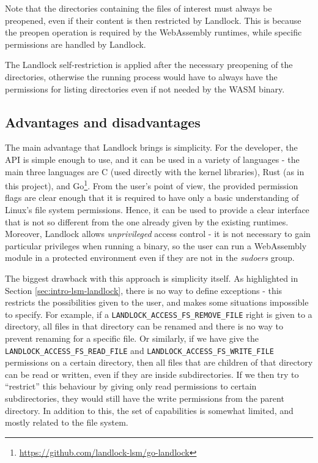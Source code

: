 Note that the directories containing the files of interest must always be preopened,
even if their content is then restricted by Landlock. This is because the preopen operation
is required by the WebAssembly runtimes, while specific permissions are handled by Landlock.

The Landlock self-restriction is applied after the necessary preopening of the directories,
otherwise the running process would have to always have the permissions for listing directories even if
not needed by the WASM binary.

\subsection{Advantages and disadvantages}

The main advantage that Landlock brings is simplicity. For the developer, the API is simple enough to use,
and it can be used in a variety of languages - the main three languages are C (used directly with the kernel libraries),
Rust (as in this project), and Go\footnote{\url{https://github.com/landlock-lsm/go-landlock}}.
From the user's point of view, the provided permission flags are clear enough that it is required to have
only a basic understanding of Linux's file system permissions.
Hence, it can be used to provide a clear interface that is not so different from the one already given by
the existing runtimes.
Moreover, Landlock allows \textit{unprivileged} access control - it is not necessary to gain particular privileges
when running a binary, so the user can run a WebAssembly module in a protected environment even if they are not
in the \textit{sudoers} group.

The biggest drawback with this approach is simplicity itself. As highlighted in Section \ref{sec:intro-lsm-landlock},
there is no way to define exceptions - this restricts the possibilities given to the user, and makes some situations
impossible to specify. For example, if a \texttt{LANDLOCK\_ACCESS\_FS\_REMOVE\_FILE} right is given to a directory,
all files in that directory can be renamed and there is no way to prevent renaming for a specific file.
Or similarly, if we have give the \texttt{LANDLOCK\_ACCESS\_FS\_READ\_FILE} and \texttt{LANDLOCK\_ACCESS\_FS\_WRITE\_FILE}
permissions on a certain directory, then all files that are children of that directory can be read or written, even
if they are inside subdirectories. If we then try to ``restrict'' this behaviour by giving only read permissions to
certain subdirectories, they would still have the write permissions from the parent directory.
In addition to this, the set of capabilities is somewhat limited, and mostly related to the file system.


